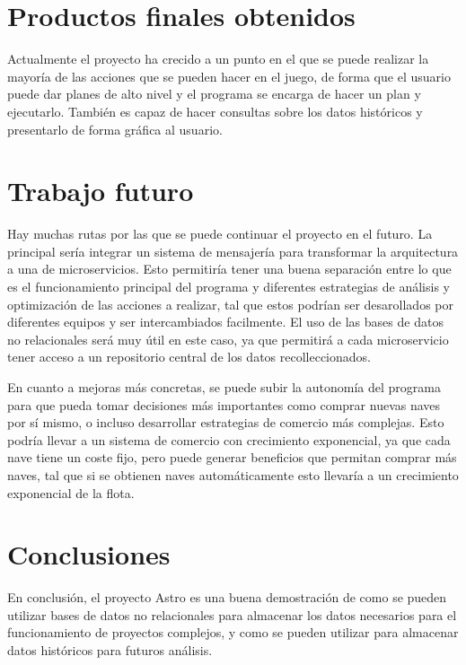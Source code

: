 \documentclass[spanish]{article}
\begin{document}
\section{Productos finales obtenidos}

Actualmente el proyecto ha crecido a un punto en el que
se puede realizar la mayoría de las acciones que se pueden hacer en el juego,
de forma que el usuario puede dar planes de alto nivel
y el programa se encarga de hacer un plan y ejecutarlo.
También es capaz de hacer consultas sobre los datos históricos
y presentarlo de forma gráfica al usuario.

\section{Trabajo futuro}

Hay muchas rutas por las que se puede continuar el proyecto en el futuro.
La principal sería integrar un sistema de mensajería para
transformar la arquitectura a una de microservicios.
Esto permitiría tener una buena separación entre lo que es
el funcionamiento principal del programa y diferentes estrategias
de análisis y optimización de las acciones a realizar, tal que estos podrían
ser desarollados por diferentes equipos y ser intercambiados facilmente.
El uso de las bases de datos no relacionales será muy útil en este caso,
ya que permitirá a cada microservicio tener acceso a un repositorio central
de los datos recolleccionados.

En cuanto a mejoras más concretas,
se puede subir la autonomía del programa para que pueda tomar decisiones
más importantes como comprar nuevas naves por sí mismo, o incluso
desarrollar estrategias de comercio más complejas.
Esto podría llevar a un sistema de comercio con crecimiento
exponencial, ya que cada nave tiene un coste fijo, pero
puede generar beneficios que permitan comprar más naves,
tal que si se obtienen naves automáticamente esto llevaría
a un crecimiento exponencial de la flota.

\section{Conclusiones}

En conclusión, el proyecto Astro es una buena demostración
de como se pueden utilizar bases de datos no relacionales
para almacenar los datos necesarios para el funcionamiento
de proyectos complejos, y como se pueden utilizar para
almacenar datos históricos para futuros análisis.
\end{document}
